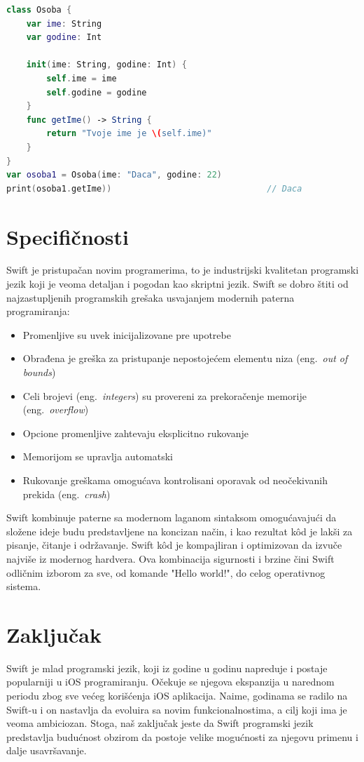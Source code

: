 \documentclass[a4paper]{article}
\begin{document}
\begin{lstlisting}[language=Swift, caption={Klasa},frame=single, label=simple]
class Osoba {
    var ime: String
    var godine: Int
    
    init(ime: String, godine: Int) {
        self.ime = ime
        self.godine = godine
    }
    func getIme() -> String {
        return "Tvoje ime je \(self.ime)"
	}
}
var osoba1 = Osoba(ime: "Daca", godine: 22)
print(osoba1.getIme))								// Daca
\end{lstlisting}

\section{Specifičnosti}	
\label{sec:osmiDeo}
Swift je pristupačan novim programerima, to je industrijski kvalitetan programski jezik koji je veoma detaljan i pogodan kao skriptni jezik. Swift se dobro štiti od najzastupljenih programskih grešaka usvajanjem modernih paterna programiranja:
\begin{itemize}
\item Promenljive su uvek inicijalizovane pre upotrebe
\item Obrađena je greška za pristupanje nepostojećem elementu niza (eng.~{\em out of bounds})
\item Celi brojevi (eng.~{\em integers}) su provereni za prekoračenje memorije (eng.~{\em overflow})
\item Opcione promenljive zahtevaju eksplicitno rukovanje
\item Memorijom se upravlja automatski
\item Rukovanje greškama omogućava kontrolisani oporavak od neočekivanih prekida (eng.~{\em crash})
\end{itemize}

Swift kombinuje paterne sa modernom laganom sintaksom omogućavajući da složene ideje budu predstavljene na koncizan način, i kao rezultat k\^{o}d je lakši za pisanje, čitanje i održavanje. Swift k\^{o}d je kompajliran i optimizovan da izvuče najviše iz modernog hardvera. Ova kombinacija sigurnosti i brzine čini Swift odličnim izborom za sve, od komande "Hello world!", do celog operativnog sistema.

\section{Zaključak}
\label{sec:zakljucak}
Swift je mlad programski jezik, koji iz godine u godinu napreduje i postaje popularniji u iOS programiranju. Očekuje se njegova ekspanzija u narednom periodu zbog sve većeg korišćenja iOS aplikacija. Naime, godinama se radilo na Swift-u i on nastavlja da evoluira sa novim funkcionalnostima, a cilj koji ima je veoma ambiciozan. Stoga, naš zaključak jeste da Swift programski jezik predstavlja budućnost obzirom da postoje velike mogućnosti za njegovu primenu i dalje usavršavanje.
\end{document}
